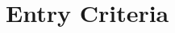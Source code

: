 \documentclass[../../../../testPlan.tex]{subfiles}
\begin{document}
	\section{Entry Criteria}
\end{document}
